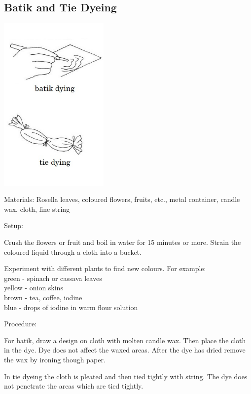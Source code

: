 \begin{multicols}{2}
\vfill
\columnbreak

\subsection{Batik and Tie Dyeing} 

\begin{center}
\includegraphics[width=0.4\textwidth]{./img/vso/tie-dyeing.jpg}
\end{center}

\begin{description*}
\item[Materials:]{Rosella leaves, coloured flowers, fruits, etc., metal container, candle wax, cloth, fine string}
\item[Setup:]{Crush the flowers or fruit and boil in water for 15 minutes or more. Strain the coloured liquid through a cloth into a bucket.

Experiment with different plants to find new colours. For example:\\
green - spinach or cassava leaves\\
yellow - onion skins\\
brown - tea, coffee, iodine\\
blue - drops of iodine in warm flour solution}
\item[Procedure:]{For batik, draw a design on cloth with molten candle wax. Then place the cloth in the dye. Dye does not affect the waxed areas. After the dye has dried remove the wax by ironing though paper.

In tie dyeing the cloth is pleated and then tied tightly with string. The dye does not penetrate the areas which are tied tightly.}
\end{description*}



\end{multicols}

\pagebreak